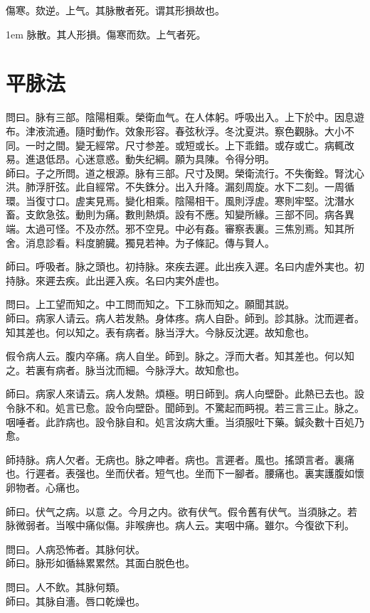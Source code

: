 傷寒。欬逆。上气。其脉散者死。谓其形損故也。

\hangindent 1em
脉散。其人形損。傷寒而欬。上气者死。

\chapter{平脉法}

問曰。脉有三部。陰陽相乘。榮衛血气。在人体躬。呼吸出入。上下於中。因息遊布。津液流通。隨时動作。效象形容。春弦秋浮。冬沈夏洪。察色觀脉。大小不同。一时之間。變无經常。尺寸参差。或短或长。上下乖錯。或存或亡。病輒改易。進退低昂。心迷意惑。動失纪綱。願为具陳。令得分明。\\
師曰。子之所問。道之根源。脉有三部。尺寸及関。榮衛流行。不失衡銓。腎沈心洪。肺浮肝弦。此自經常。不失銖分。出入升降。漏刻周旋。水下二刻。一周循環。当復寸口。虗実見焉。變化相乘。陰陽相干。風則浮虗。寒則牢堅。沈潛水畜。支飲急弦。動則为痛。數則熱煩。設有不應。知變所緣。三部不同。病各異端。太過可怪。不及亦然。邪不空見。中必有姦。審察表裏。三焦別焉。知其所舍。消息診看。料度腑臓。獨見若神。为子條記。傳与賢人。

師曰。呼吸者。脉之頭也。初持脉。來疾去遲。此出疾入遲。名曰内虗外実也。初持脉。來遲去疾。此出遲入疾。名曰内実外虗也。

問曰。上工望而知之。中工問而知之。下工脉而知之。願聞其説。\\
師曰。病家人请云。病人若发熱。身体疼。病人自卧。師到。診其脉。沈而遲者。知其差也。何以知之。表有病者。脉当浮大。今脉反沈遲。故知愈也。

假令病人云。腹内卒痛。病人自坐。師到。脉之。浮而大者。知其差也。何以知之。若裏有病者。脉当沈而細。今脉浮大。故知愈也。

師曰。病家人來请云。病人发熱。煩極。明日師到。病人向壁卧。此熱已去也。設令脉不和。処言已愈。設令向壁卧。聞師到。不驚起而眄視。若三言三止。脉之。咽唾者。此詐病也。設令脉自和。処言汝病大重。当須服吐下藥。鍼灸數十百処乃愈。

師持脉。病人欠者。无病也。脉之呻者。病也。言遲者。風也。搖頭言者。裏痛也。行遲者。表强也。坐而伏者。短气也。坐而下一腳者。腰痛也。裏実護腹如懷卵物者。心痛也。

師曰。伏气之病。以意{\sungtpii 𠊱}之。今月之内。欲有伏气。假令舊有伏气。当須脉之。若脉微弱者。当喉中痛似傷。非喉痹也。病人云。実咽中痛。雖尔。今復欲下利。

問曰。人病恐怖者。其脉何状。\\
師曰。脉形如循絲累累然。其面白脱色也。

問曰。人不飲。其脉何類。\\
師曰。其脉自濇。唇口乾燥也。

